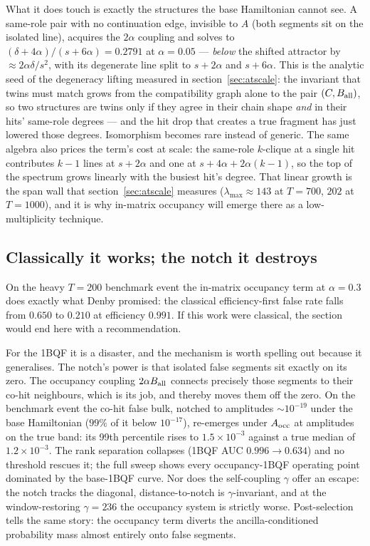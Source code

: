 \documentclass[11pt,a4paper]{article}
\begin{document}
What it does touch is exactly the structures the base Hamiltonian
cannot see. A same-role pair with no continuation edge, invisible to
$A$ (both segments sit on the isolated line), acquires the
$2\alpha$ coupling and solves to $(\delta+4\alpha)/(s+6\alpha)
=0.2791$ at $\alpha=0.05$ — \emph{below} the shifted attractor by
$\approx 2\alpha\delta/s^2$, with its degenerate line split to
$s+2\alpha$ and $s+6\alpha$. This is the analytic seed of the
degeneracy lifting measured in section~\ref{sec:atscale}: the
invariant that twins must match grows from the compatibility graph alone
to the pair $(C, B_{\rm all})$, so two structures are twins only if
they agree in their chain shape \emph{and} in their hits' same-role
degrees — and the hit drop that creates a true fragment has just
lowered those degrees. Isomorphism becomes rare instead of generic.
The same algebra also prices the term's cost at scale: the
same-role $k$-clique at a single hit contributes $k{-}1$ lines at
$s+2\alpha$ and one at $s+4\alpha+2\alpha(k{-}1)$, so the top of the
spectrum grows linearly with the busiest hit's degree. That linear
growth is the span wall that section~\ref{sec:atscale} measures
($\lambda_{\max}\approx143$ at $T{=}700$, $202$ at $T{=}1000$), and
it is why in-matrix occupancy will emerge there as a low-multiplicity
technique.

\subsection{Classically it works; the notch it destroys}

On the heavy $T=200$ benchmark event the in-matrix occupancy term at
$\alpha=0.3$ does exactly what Denby promised: the classical
efficiency-first false rate falls from $0.650$ to $0.210$ at
efficiency $0.991$. If this work were classical, the section would
end here with a recommendation.

For the 1BQF it is a disaster, and the mechanism is worth spelling
out because it generalises. The notch's power is that isolated false
segments sit exactly on its zero. The occupancy coupling
$2\alpha B_{\rm all}$ connects precisely those segments to their
co-hit neighbours, which is its job, and thereby moves them off the
zero. On the benchmark event the co-hit false bulk, notched to
amplitudes $\sim10^{-19}$ under the base Hamiltonian ($99\%$ of it
below $10^{-17}$), re-emerges under $A_{\rm occ}$ at amplitudes on
the true band: its 99th percentile rises to $1.5\times10^{-3}$
against a true median of $1.2\times10^{-3}$. The rank separation
collapses (1BQF AUC $0.996\to0.634$) and no threshold rescues it;
the full sweep shows every occupancy-1BQF operating point dominated
by the base-1BQF curve. Nor does the self-coupling $\gamma$ offer an
escape: the notch tracks the diagonal, distance-to-notch is
$\gamma$-invariant, and at the window-restoring $\gamma=236$ the
occupancy system is strictly worse. Post-selection tells the same
story: the occupancy term diverts the ancilla-conditioned
probability mass almost entirely onto false segments.
\end{document}
